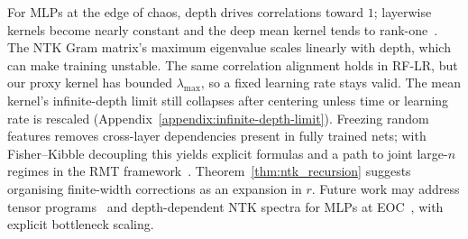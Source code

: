 For MLPs at the edge of chaos, depth drives correlations toward \(1\); layerwise kernels become nearly constant and the deep mean kernel tends to rank-one~\cite{terjek2025mlpsateoc,pmlr-v163-hayou22a}. The NTK Gram matrix's maximum eigenvalue scales linearly with depth, which can make training unstable. The same correlation alignment holds in RF-LR, but our proxy kernel has bounded \(\lambda_{\max}\), so a fixed learning rate stays valid. The mean kernel's infinite-depth limit still collapses after centering unless time or learning rate is rescaled (Appendix~\ref{appendix:infinite-depth-limit}). Freezing random features removes cross-layer dependencies present in fully trained nets; with Fisher--Kibble decoupling this yields explicit formulas and a path to joint large-\(n\) regimes in the RMT framework~\cite{benigni2025eigenvaluedistributionneuraltangent}. Theorem~\ref{thm:ntk_recursion} suggests organising finite-width corrections as an expansion in \(r\). Future work may address tensor programs~\cite{yang2020tensorprogramsiineural} and depth-dependent NTK spectra for MLPs at EOC~\cite{terjek2025mlpsateoc}, with explicit bottleneck scaling.

